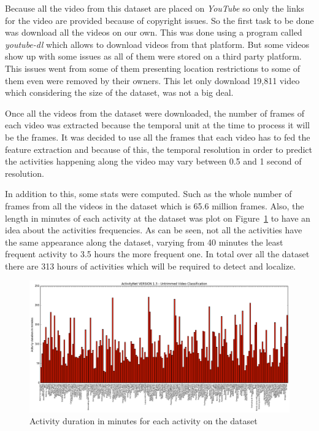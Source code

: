 Because all the video from this dataset are placed on \textit{YouTube} so only the links for the video are provided because of copyright issues. So the first task to be done was download all the videos on our own. This was done using a program called \textit{youtube-dl} which allows to download videos from that platform. But some videos show up with some issues as all of them were stored on a third party platform. This issues went from some of them presenting location restrictions to some of them  even were removed by their owners. This let only download 19,811 video which considering the size of the dataset, was not a big deal.

Once all the videos from the dataset were downloaded, the number of frames of each video was extracted because the temporal unit at the time to process it will be the frames. It was decided to use all the frames that each video has to fed the feature extraction and because of this, the temporal resolution in order to predict the activities happening along the video may vary between 0.5 and 1 second of resolution.

In addition to this, some stats were computed. Such as the whole number of frames from all the videos in the dataset which is 65.6 million frames. Also, the length in minutes of each activity at the dataset was plot on Figure~\ref{fig:dataset_stats} to have an idea about the activities frequencies. As can be seen, not all the activities have the same appearance along the dataset, varying from 40 minutes the least frequent activity to 3.5 hours the more frequent one. In total over all the dataset there are 313 hours of activities which will be required to detect and localize.

\begin{figure}[H]
\begin{center}
\includegraphics[width=1\linewidth]{img/methodology/dataset_stats}
\end{center}
\caption{Activity duration in minutes for each activity on the dataset}
\label{fig:dataset_stats}
\end{figure}


